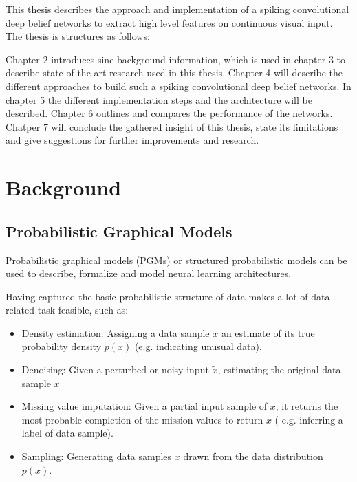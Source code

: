 This thesis describes the approach and implementation of a spiking convolutional deep belief networks to extract high level features on continuous visual input. The thesis is structures as follows:

Chapter 2 introduces sine background information, which is used in chapter 3 to describe state-of-the-art research used in this thesis. Chapter 4 will describe the different approaches to build such a spiking convolutional deep belief networks. In chapter 5 the different implementation steps and the architecture will be described. Chapter 6 outlines and compares the performance of the networks. Chatper 7 will conclude the gathered insight of this thesis, state its limitations and give suggestions for further improvements and research.  

\chapter{Background}

\section{Probabilistic Graphical Models}

Probabilistic graphical models (PGMs) or structured probabilistic models can be used to describe, formalize and model neural learning architectures.

Having captured the basic probabilistic structure of data makes a lot of data-related task feasible, such as:
\begin{itemize}

\item Density estimation: Assigning a data sample $x$ an estimate of its true probability density $p(x)$ (e.g. indicating unusual data).

\item Denoising: Given a perturbed or noisy input $\widetilde{x}$,  estimating the original data sample $x$

\item Missing value imputation: Given a partial input sample of $x$, it returns the most probable completion of the mission values to return $x$ ( e.g. inferring a label of data sample).

\item Sampling: Generating data samples $x$ drawn from the data distribution $p(x)$. 

\end{itemize}  


